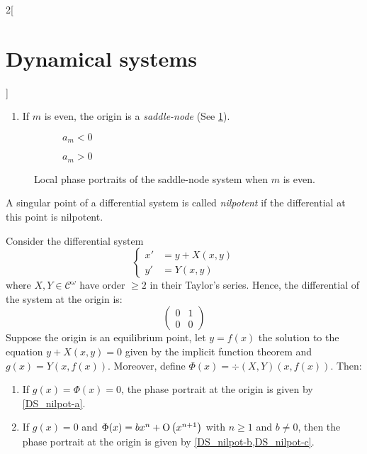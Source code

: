 \documentclass[../../../main_math.tex]{subfiles}
\begin{document}
\begin{multicols}{2}[\section{Dynamical systems}]
\begin{theorem}
\begin{enumerate}
      \item If $m$ is even, the origin is a \emph{saddle-node} (See \cref{DS_meven}).
    \end{enumerate}
    \begin{figure}[H]
      \centering
      \begin{subfigure}[b]{0.45\linewidth}
        \centering
        
        \caption{$a_m<0$}
      \end{subfigure}
      \hfill
      \begin{subfigure}[b]{0.45\linewidth}
        \centering
        
        \caption{$a_m>0$}
      \end{subfigure}
      \caption{Local phase portraits of the saddle-node system when $m$ is even.}
      \label{DS_meven}
    \end{figure}
  \end{theorem}
  \begin{definition}
    A singular point of a differential system is called \emph{nilpotent} if the differential at this point is nilpotent.
  \end{definition}
  \begin{theorem}\label{DS_thmB}
    Consider the differential system
    $$
      \left\{
      \begin{aligned}
        {x}' & = y + X(x,y) \\
        {y}' & = Y(x,y)
      \end{aligned}
      \right.
    $$
    where $X,Y\in\mathcal{C}^\omega$ have order $\geq 2$ in their Taylor's series. Hence, the differential of the system at the origin is:
    $$\begin{pmatrix}
        0 & 1 \\
        0 & 0
      \end{pmatrix}$$
    Suppose the origin is an equilibrium point, let $y=f(x)$ the solution to the equation $y+X(x,y)=0$ given by the implicit function theorem and $g(x)=Y(x,f(x))$. Moreover, define $\Phi(x)=\div(X,Y)(x,f(x))$. Then:
    \begin{enumerate}
      \renewcommand{\crefpairconjunction}{ or~}
      \item If $g(x)=\Phi(x)= 0$, the phase portrait at the origin is given by \cref{DS_nilpot-a}.
      \item If $g(x)=0$ and $\Phi(x)=bx^n +\mathrm{O}\left(x^{n+1}\right)$ with $n\geq 1$ and $b\ne 0$, then the phase portrait at the origin is given by \cref{DS_nilpot-b,DS_nilpot-c}.

\end{enumerate}
\end{theorem}
\end{multicols}
\end{document}
